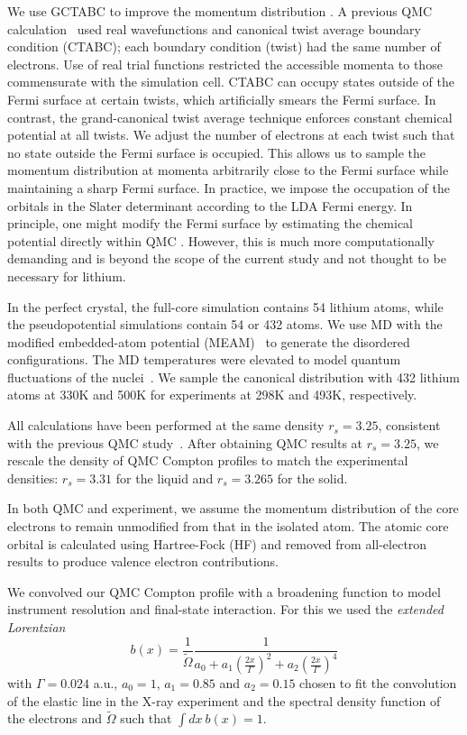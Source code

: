 \documentclass[aps,prb,showpacs,preprintnumbers,amsmath,amssymb,superscriptaddress,twocolumn]{revtex4-1}
\begin{document}
We use GCTABC to improve the momentum distribution \cite{PhysRevLett.97.076404,Holzmann2009}. A previous QMC calculation~\cite{Filippi1999} used real wavefunctions and canonical twist average boundary condition (CTABC); each boundary condition (twist) had the same number of electrons. Use of real trial functions restricted the accessible momenta to those commensurate with the simulation cell. CTABC can occupy states outside of the Fermi surface at certain twists, which artificially smears the Fermi surface. In contrast, the grand-canonical twist average technique enforces constant chemical potential at all twists. We adjust the number of electrons at each twist such that no state outside the Fermi surface is occupied. This allows us to sample the momentum distribution at momenta arbitrarily close to the Fermi surface while maintaining a sharp Fermi surface. In practice, we impose the occupation of the orbitals in the Slater determinant according to the LDA Fermi energy. In principle, one might modify the Fermi surface by estimating the chemical potential directly within QMC \cite{yang2019electronic}. However, this is much more computationally demanding and is beyond the scope of the current study and not thought to be necessary for lithium.

In the perfect crystal, the full-core simulation contains 54 lithium atoms, while the pseudopotential simulations contain 54 or 432 atoms. We use MD with the modified embedded-atom potential (MEAM)~\cite{Baskes1992} to generate the disordered configurations.
The MD temperatures were elevated to model quantum fluctuations of the nuclei~\cite{Filippi1998}.
We sample the canonical distribution with 432 lithium atoms at 330K and 500K for experiments at 298K and 493K, respectively.

All calculations have been performed at the same density $r_s=3.25$, consistent with the previous QMC study~\cite{Filippi1999}. After obtaining QMC results at $r_s=3.25$, we rescale the density of QMC Compton profiles to match the experimental densities: $r_s=3.31$ for the liquid and $r_s=3.265$ for the solid.

In both QMC and experiment, we assume the momentum distribution of the core electrons to remain unmodified from that in the isolated atom. The atomic core orbital is calculated using Hartree-Fock (HF) and removed from all-electron results to produce valence electron contributions.

We convolved our QMC Compton profile with a broadening function to model instrument resolution and final-state interaction. For this we used the \emph{extended Lorentzian}
\begin{equation}
b(x) = \frac{1}{\tilde{\Omega}} \frac{1}{
a_0+a_1(\frac{2x}{\Gamma})^2+a_2(\frac{2x}{\Gamma})^4
}\label{eq:elorentz}
\end{equation}
with $\Gamma=0.024$ a.u., $a_0=1$, $a_1=0.85$ and $a_2=0.15$ chosen to fit the convolution of the elastic line in the X-ray experiment and the spectral density function of the electrons and $\tilde{\Omega}$ such that $\int dx ~b(x)=1$. 
\end{document}
